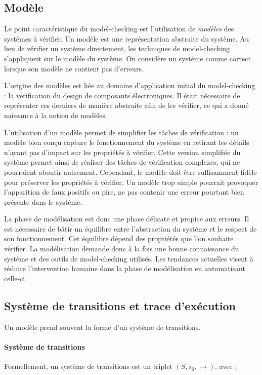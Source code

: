 \subsection{Modèle}

Le point caractéristique du model-checking est l'utilisation de
\emph{modèles} des systèmes à vérifier. Un modèle est une représentation
abstraite du système. Au lieu de vérifier un système directement, les techniques
de model-checking s'appliquent sur le modèle du système. On considère un
système comme correct lorsque son modèle ne contient pas d'erreurs.

L'origine des modèles est liée au domaine d'application initial du
model-checking : la vérification du design de composants électroniques. Il
était nécessaire de représenter ces derniers de manière abstraite afin de les
vérifier, ce qui a donné naissance à la notion de modèles.

L'utilisation d'un modèle permet de simplifier les tâches de vérification : un
modèle bien conçu capture le fonctionnement du système en retirant les détails
n'ayant pas d'impact sur les propriétés à vérifier. Cette version simplifiée du
système permet ainsi de réaliser des tâches de vérification complexes, qui ne
pourraient aboutir autrement. Cependant, le modèle doit être suffisamment fidèle
pour préserver les propriétés à vérifier. Un modèle trop simple pourrait
provoquer l'apparition de faux positifs ou pire, ne pas contenir une erreur
pourtant bien présente dans le système.

La phase de modélisation est donc une phase délicate et propice aux erreurs. Il
est nécessaire de bâtir un équilibre entre l'abstraction du système et le
respect de son fonctionnement. Cet équilibre dépend des propriétés que l'on
souhaite vérifier. La modélisation demande donc à la fois une bonne connaissance
du système et des outils de model-checking utilisés. Les tendances actuelles
visent à réduire l'intervention humaine dans la phase de modélisation en
automatisant celle-ci.

\subsection{Système de transitions et trace d'exécution}

Un modèle prend souvent la forme d'un système de transitions.

\paragraph{Système de transitions}
Formellement, un système de transitions est un triplet \((S, s_0, \rightarrow)\),
avec :


